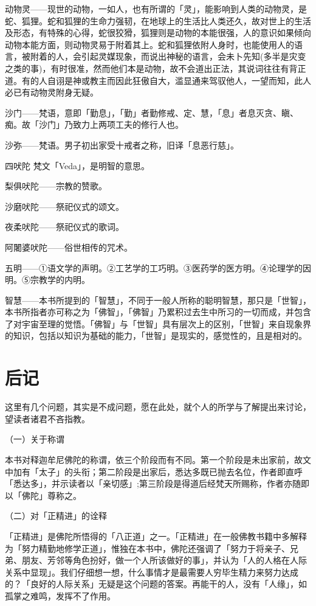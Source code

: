 \documentclass[twoside,openany]{book}
\begin{document}
\textbullet 动物灵——现世的动物，一如人，也有所谓的「灵」，能影响到人类的动物灵，是蛇、狐狸。蛇和狐狸的生命力强韧，在地球上的生活比人类还久，故对世上的生活及形态，有特殊的心得，蛇很狡猾，狐狸则是动物的本能很强，人的意识如果倾向动物本能方面，则动物灵易于附着其上。蛇和狐狸依附人身时，也能使用人的语言，被附着的人，会引起灵媒现象，而说出神秘的语言，会未卜先知(多半是灾变之类的事)，有时很准，然而他们本是动物，故不会道出正法，其说词往往有背正道。有的人自诩是神或教主而因此狂傲自大，滥显通来驾驭他人，一望而知，此人必已有动物灵附身无疑。

\textbullet 沙门——梵语，意即「勤息」，「勤」者勤修戒、定、慧，「息」者息灭贪、瞋、痴。故「沙门」乃致力上两项工夫的修行人也。

\textbullet 沙弥——梵语。男子初出家受十戒者之称，旧译「息恶行慈」。

\textbullet 四吠陀	梵文「Veda」，是明智的意思。

\textperiodcentered 梨俱吠陀——宗教的赞歌。

\textperiodcentered 沙磨吠陀——祭祀仪式的颂文。

\textperiodcentered 夜柔吠陀——祭祀仪式的歌词。

\textperiodcentered 阿闍婆吠陀——俗世相传的咒术。

\textbullet 五明——①语文学的声明。②工艺学的工巧明。③医药学的医方明。④论理学的因明。⑤宗教学的内明。

\textbullet 智慧——本书所提到的「智慧」，不同于一般人所称的聪明智慧，那只是「世智」，本书所指者亦可称之为「佛智」，「佛智」乃累积过去生中所习的一切而成，并包含了对宇宙至理的觉悟。「佛智」与「世智」具有层次上的区别，「世智」来自现象界的知识，包括以知识为基础的能力，「世智」是现实的，感觉性的，且是相对的。
\fi

\chapter*{后记}

这里有几个问题，其实是不成问题，愿在此处，就个人的所学与了解提出来讨论，望读者诸君不吝指教。

（一）关于称谓

本书对释迦牟尼佛陀的称谓，依三个阶段而有不同。第一个阶段是未出家前，故文中加有「太子」的头衔；第二阶段是出家后，悉达多既已抛去名位，作者即直呼「悉达多」，并示读者以「亲切感」;第三阶段是得道后经梵天所赐称，作者亦随即以「佛陀」尊称之。

（二）对「正精进」的诠释

「正精进」是佛陀所悟得的「八正道」之一。「正精进」在一般佛教书籍中多解释为「努力精勤地修学正道」，惟独在本书中，佛陀还强调了「努力于将亲子、兄弟、朋友、芳邻等角色扮好，做一个人所该做好的事」，并认为「人的人格在人际关系中显现」。我们仔细想一想，什么事情才是最需要人穷毕生精力来努力达成的？「良好的人际关系」无疑是这个问题的答案。再能干的人，没有「人缘」，如孤掌之难鸣，发挥不了作用。
\end{document}
